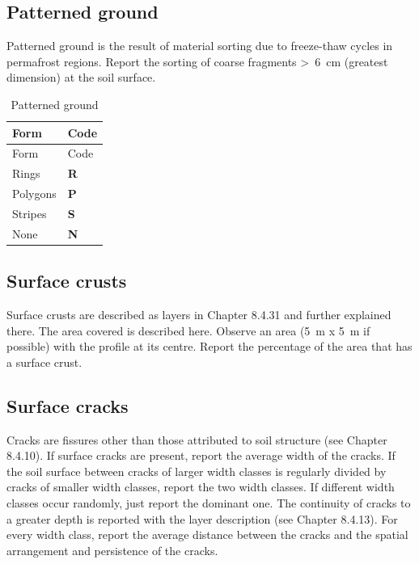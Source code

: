 \documentclass[
  letterpaper,
  DIV=11,
  numbers=noendperiod]{scrreprt}
\begin{document}
\hypertarget{patterned-ground}{%
\subsection{Patterned ground}\label{patterned-ground}}

Patterned ground is the result of material sorting due to freeze-thaw
cycles in permafrost regions. Report the sorting of coarse fragments
\textgreater~6~cm (greatest dimension) at the soil surface.

\begin{longtable}[]{@{}ll@{}}
\caption{Patterned ground}\tabularnewline
\toprule()
Form & Code \\
\midrule()
\endfirsthead
\toprule()
Form & Code \\
\midrule()
\endhead
Rings & \textbf{R} \\
Polygons & \textbf{P} \\
Stripes & \textbf{S} \\
None & \textbf{N} \\
\bottomrule()
\end{longtable}

\hypertarget{surface-crusts}{%
\subsection{Surface crusts}\label{surface-crusts}}

Surface crusts are described as layers in Chapter 8.4.31 and further
explained there. The area covered is described here. Observe an area
(5~m x 5~m if possible) with the profile at its centre. Report the
percentage of the area that has a surface crust.

\hypertarget{surface-cracks}{%
\subsection{Surface cracks}\label{surface-cracks}}

Cracks are fissures other than those attributed to soil structure (see
Chapter 8.4.10). If surface cracks are present, report the average width
of the cracks. If the soil surface between cracks of larger width
classes is regularly divided by cracks of smaller width classes, report
the two width classes. If different width classes occur randomly, just
report the dominant one. The continuity of cracks to a greater depth is
reported with the layer description (see Chapter 8.4.13). For every
width class, report the average distance between the cracks and the
spatial arrangement and persistence of the cracks.
\end{document}
